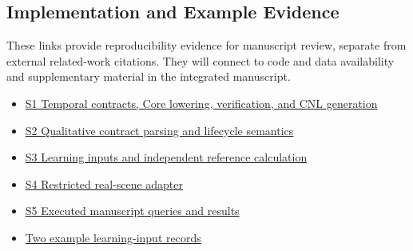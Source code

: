 \documentclass[11pt,a4paper]{article}
\begin{document}
\begingroup\small\setlength{\parskip}{3pt}
\subsection*{Implementation and Example Evidence}

These links provide reproducibility evidence for manuscript review, separate from external related-work citations. They will connect to code and data availability and supplementary material in the integrated manuscript.\par

\begin{itemize}\setlength{\itemsep}{0pt}\setlength{\parsep}{0pt}\setlength{\topsep}{2pt}
\item \href{\detokenize{../../../../../../projects/04-guardsynth-coc/experiments/paper1_cnl_learning/temporal_preservation.py}}{S1 Temporal contracts, Core lowering, verification, and CNL generation}
\item \href{\detokenize{../../../../../../platforms/eblc-bcv/src/guard_synth_eblc/action_contract.py}}{S2 Qualitative contract parsing and lifecycle semantics}
\item \href{\detokenize{../../../../../../projects/04-guardsynth-coc/experiments/paper1_cnl_learning/temporal_training_data.py}}{S3 Learning inputs and independent reference calculation}
\item \href{\detokenize{../../../../../../projects/04-guardsynth-coc/src/guard_synth/qualitative_scene_contract.py}}{S4 Restricted real-scene adapter}
\item \href{\detokenize{../methodology-2026-09-30-001/manuscript_examples.json}}{S5 Executed manuscript queries and results}
\item \href{\detokenize{../methodology-2026-09-30-001/learning_input_examples.json}}{Two example learning-input records}
\end{itemize}
\endgroup
\end{document}

